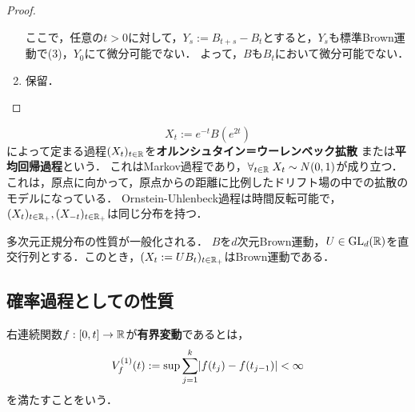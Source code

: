 \documentclass[uplatex,dvipdfmx]{jsreport}
\begin{document}
\begin{proof}
\begin{enumerate}
        ここで，任意の$t>0$に対して，$Y_s:=B_{t+s}-B_t$とすると，$Y_s$も標準Brown運動で(3)，$Y_0$にて微分可能でない．
        よって，$B$も$B_t$において微分可能でない．
        \item 保留．
    \end{enumerate}
\end{proof}

\begin{example}
    \[X_t:=e^{-t}B(e^{2t})\]
    によって定まる過程$(X_t)_{t\in\mathbb{R}}$を\textbf{オルンシュタイン＝ウーレンベック拡散}
    または\textbf{平均回帰過程}という．
    これはMarkov過程であり，$\forall_{t\in\mathbb{R}}\;X_t\sim N(0,1)$が成り立つ．
    これは，原点に向かって，原点からの距離に比例したドリフト場の中での拡散のモデルになっている．
    Ornstein-Uhlenbeck過程は時間反転可能で，$(X_t)_{t\in\mathbb{R}_+},(X_{-t})_{t\in\mathbb{R}_+}$は同じ分布を持つ．
\end{example}

\begin{proposition}
    多次元正規分布の性質が一般化される．
    $B$を$d$次元Brown運動，$U\in\mathrm{GL}_d(\mathbb{R})$を直交行列とする．このとき，$(X_t:=UB_t)_{t\in\mathbb{R}_+}$はBrown運動である．
\end{proposition}

\subsection{確率過程としての性質}

\begin{definition}
    右連続関数$f:[0,t]\to\mathbb{R}$が\textbf{有界変動}であるとは，
    \[V_f^{(1)}(t):=\sup\sum^k_{j=1}\lvert f(t_j)-f(t_{j-1})\rvert<\infty\]
    を満たすことをいう．
\end{definition}
\end{document}
